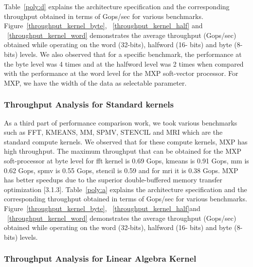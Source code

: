 Table~\ref{poly:d} explains the architecture specification and the corresponding throughput obtained in terms of Gops/sec for various benchmarks. Figure~\ref{throughput_kernel_byte}, ~\ref{throughput_kernel_half} and ~\ref{throughput_kernel_word} demonstrates the average throughput (Gops/sec) obtained while operating on the word (32-bits), halfword (16- bits) and byte (8-bits) levels.
 We also observed that for a specific benchmark, the performance at the byte level was 4 times and at the halfword level was 2 times when compared with the performance at the word level for the MXP soft-vector processor. For MXP, we have the width of the data as selectable parameter.


%
%
%
%
%
%

\subsubsection{Throughput Analysis for Standard kernels}

As a third part of performance comparison work, we took various benchmarks such as FFT, KMEANS, MM, SPMV, STENCIL and MRI which are the standard compute kernels. We observed that for these compute kernels, MXP has high throughput. The maximum throughput that can be obtained for the MXP soft-processor at byte level for fft kernel is 0.69 Gops, kmeans is 0.91 Gops, mm is 0.62 Gops, spmv is 0.55 Gops, stencil is 0.59 and for mri it is 0.38 Gops. MXP has better speedups due to the superior double-buffered memory transfer optimization [3.1.3]. Table~\ref{poly:a} explains the architecture specification and the corresponding throughput obtained in terms of Gops/sec for various benchmarks. Figure~\ref{throughput_kernel_byte}, ~\ref{throughput_kernel_half}and ~\ref{throughput_kernel_word} demonstrates the average throughput (Gops/sec) obtained while operating on the word (32-bits), halfword (16- bits) and byte (8-bits) levels.


%
%
%

\subsubsection{Throughput Analysis for Linear Algebra Kernel}

